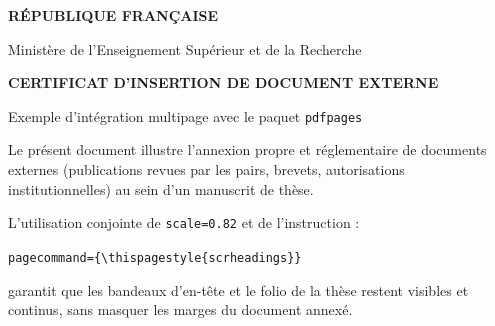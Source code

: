 \documentclass[a4paper,11pt]{article}
\begin{document}
\thispagestyle{empty}
\begin{center}
  \vspace*{1.5cm}
  {\LARGE\bfseries R\'EPUBLIQUE FRAN\c{C}AISE\par}
  \vspace{0.5cm}
  {\Large Minist\`ere de l'Enseignement Sup\'erieur et de la Recherche\par}
  \vspace{1.5cm}
  {\Large\bfseries CERTIFICAT D'INSERTION DE DOCUMENT EXTERNE\par}
  \vspace{0.5cm}
  {\large Exemple d'int\'egration multipage avec le paquet \texttt{pdfpages}\par}
\end{center}
\vspace{1.5cm}
\noindent Le pr\'esent document illustre l'annexion propre et r\'eglementaire de documents externes (publications revues par les pairs, brevets, autorisations institutionnelles) au sein d'un manuscrit de th\`ese.
\par\vspace{1cm}
\noindent L'utilisation conjointe de \texttt{scale=0.82} et de l'instruction :
\begin{center}
  \texttt{pagecommand=\{\textbackslash thispagestyle\{scrheadings\}\}}
\end{center}
garantit que les bandeaux d'en-t\^ete et le folio de la th\`ese restent visibles et continus, sans masquer les marges du document annex\'e.
\end{document}
